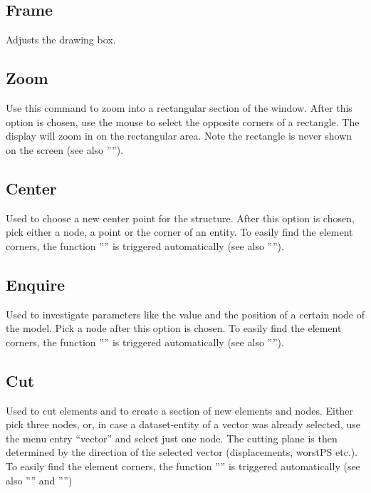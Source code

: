 \documentclass{article}
\begin{document}
\subsection{\label{Frame}Frame}
Adjusts the drawing box.

\subsection{\label{Zoom}Zoom}
Use this command to zoom into a rectangular section of the window. After this option is chosen, use the mouse to select the opposite corners of a rectangle.  The display will zoom in on the rectangular area.  Note the rectangle is never shown on the screen (see also '''').

\subsection{\label{Center}Center}
Used to choose a new center point for the structure. After this option is chosen, pick either a node, a point or the corner of an entity. To easily find the element corners, the function '''' is triggered automatically (see also '''').

\subsection{\label{Enquire}Enquire}
Used to investigate parameters like the value and the position of a certain node of the model. Pick a node after this option is chosen. To easily find the element corners, the function '''' is triggered automatically (see also '''').

\subsection{\label{Cut}Cut}
Used to cut elements and to create a section of new elements and nodes. Either pick three nodes, or, in case a dataset-entity of a vector was already selected, use the menu entry ``vector'' and select just one node. The cutting plane is then determined by the direction of the selected vector (displacements, worstPS etc.). To easily find the element corners, the function '''' is triggered automatically (see also '''' and '''')
\end{document}
